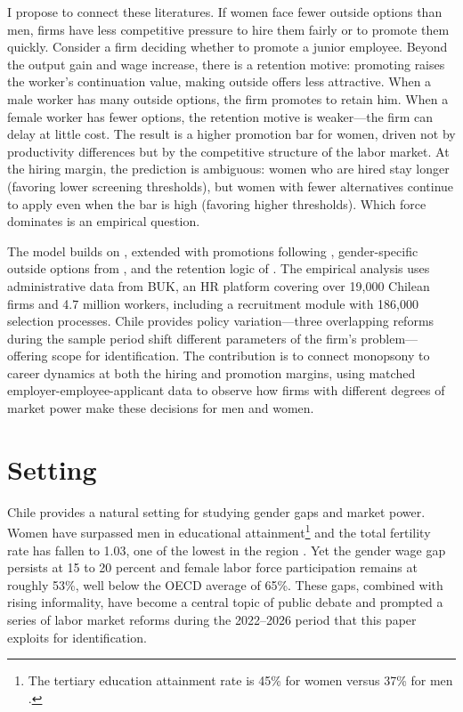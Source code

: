 \documentclass[11pt]{article}
\begin{document}
I propose to connect these literatures. If women face fewer outside options than men, firms have less competitive pressure to hire them fairly or to promote them quickly. Consider a firm deciding whether to promote a junior employee. Beyond the output gain and wage increase, there is a retention motive: promoting raises the worker's continuation value, making outside offers less attractive. When a male worker has many outside options, the firm promotes to retain him. When a female worker has fewer options, the retention motive is weaker---the firm can delay at little cost. The result is a higher promotion bar for women, driven not by productivity differences but by the competitive structure of the labor market. At the hiring margin, the prediction is ambiguous: women who are hired stay longer (favoring lower screening thresholds), but women with fewer alternatives continue to apply even when the bar is high (favoring higher thresholds). Which force dominates is an empirical question.

The model builds on \citet{burdett_wage_1998}, extended with promotions following \citet{gibbons_theory_1999}, gender-specific outside options from \citet{sharma_monopsony_2023}, and the retention logic of \citet{postel-vinay_equilibrium_2002}. The empirical analysis uses administrative data from BUK, an HR platform covering over 19,000 Chilean firms and 4.7 million workers, including a recruitment module with 186,000 selection processes. Chile provides policy variation---three overlapping reforms during the sample period shift different parameters of the firm's problem---offering scope for identification. The contribution is to connect monopsony to career dynamics at both the hiring and promotion margins, using matched employer-employee-applicant data to observe how firms with different degrees of market power make these decisions for men and women.

\fi
\section{Setting}

Chile provides a natural setting for studying gender gaps and market power. Women have surpassed men in educational attainment\footnote{The tertiary education attainment rate is 45\% for women versus 37\% for men \citep{oecd_education_2024}.} and the total fertility rate has fallen to 1.03, one of the lowest in the region \citep{ine_anuario_2024}. Yet the gender wage gap persists at 15 to 20 percent and female labor force participation remains at roughly 53\%, well below the OECD average of 65\%. These gaps, combined with rising informality, have become a central topic of public debate and prompted a series of labor market reforms during the 2022--2026 period that this paper exploits for identification.
\end{document}
